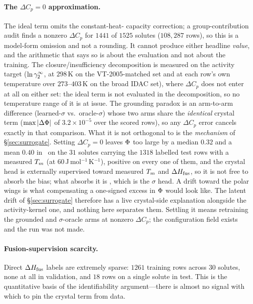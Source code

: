 \paragraph{The $\Delta C_p=0$ approximation.} The ideal term omits the constant-heat-
capacity correction; a group-contribution audit finds a nonzero $\Delta C_p$ for
$1441$ of $1525$ solutes ($108{,}287$ rows), so this is a model-form
omission and not a rounding. It cannot produce either headline \emph{value}, and the arithmetic that
says so is about the evaluation and not about the training. The closure/insufficiency
decomposition is measured on the activity target ($\ln\gamma_2^\infty$, at $298$\,K on the VT-2005-matched set and at each
row's own temperature over $273$--$403$\,K on the broad IDAC set), where $\Delta C_p$
does not enter at all on either set: the ideal term is not evaluated in the decomposition, so no
temperature range of it is at issue. The grounding paradox is an arm-to-arm difference (learned-$\sigma$
vs.\ oracle-$\sigma$) whose two arms share the \emph{identical} crystal term ($\max|\Delta\Phi|$
of $3.2\times10^{-5}$ over the scored rows), so any $\Delta C_p$
error cancels exactly in that comparison.
What it is not orthogonal to is the \emph{mechanism} of \S\ref{sec:surrogate}. Setting
$\Delta C_p=0$ leaves $\Phi$ too large by a median $0.32$ and a mean $0.40$ in \lnx\ on the $31$ solutes carrying the $1318$
labelled test rows with a measured $T_m$ (at $60$\,J\,mol$^{-1}$\,K$^{-1}$), positive on every one of
them, and the crystal head is externally supervised toward measured $T_m$ and $\Delta H_{\mathrm{fus}}$, so it is not
free to absorb the bias; what absorbs it is \lng, which is the $\sigma$ head. A drift toward the
polar wings is what compensating a one-signed excess in $\Phi$ would look like. The latent drift
of \S\ref{sec:surrogate} therefore has a live crystal-side explanation alongside the
activity-kernel one, and nothing here separates them. Settling it means retraining the grounded and
$\sigma$-oracle arms at nonzero $\Delta C_p$; the configuration field exists and the run was not
made.
\paragraph{Fusion-supervision scarcity.} Direct $\Delta H_{\mathrm{fus}}$ labels are extremely sparse:
$1261$ training rows across $30$ solutes, none at all in validation, and $18$ rows on a
single solute in test.
This is the quantitative basis of the identifiability argument---there is almost no
signal with which to pin the crystal term from data.
